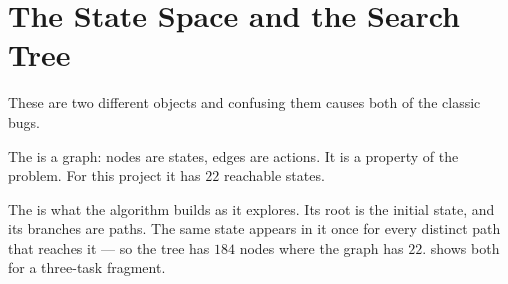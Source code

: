 \section{The State Space and the Search Tree}

These are two different objects and confusing them causes both of the classic bugs.

The  is a graph: nodes are states, edges are actions. It is a
property of the problem. For this project it has $22$ reachable states.

The  is what the algorithm builds as it explores. Its root is the
initial state, and its branches are paths. The same state appears in it once for
every distinct path that reaches it --- so the tree has $184$ nodes where the graph
has $22$.  shows both for a three-task fragment.

